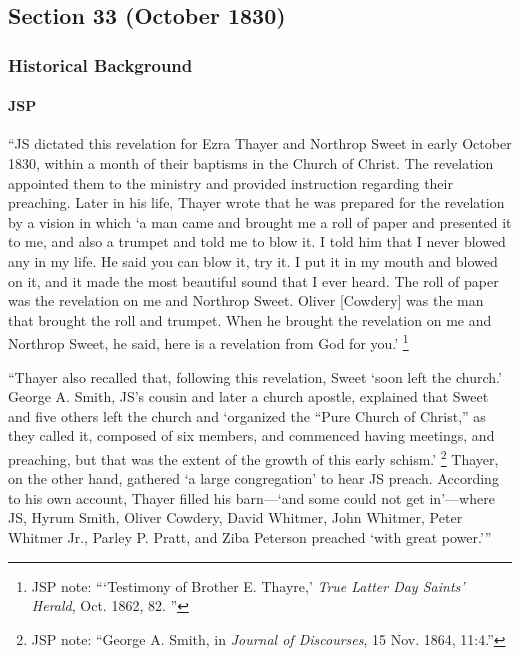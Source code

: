 \subsection{Section 33 (October 1830)}
	\label{DC33}

	\subsubsection{Historical Background}
		\label{DC33-HB}
		
		\paragraph{JSP}
		
			``JS dictated this revelation for Ezra Thayer and Northrop Sweet in early October 1830, within a month of their baptisms in the Church of Christ. The revelation appointed them to the ministry and provided instruction regarding their preaching. Later in his life, Thayer wrote that he was prepared for the revelation by a vision in which `a man came and brought me a roll of paper and presented it to me, and also a trumpet and told me to blow it. I told him that I never blowed any in my life. He said you can blow it, try it. I put it in my mouth and blowed on it, and it made the most beautiful sound that I ever heard. The roll of paper was the revelation on me and Northrop Sweet. Oliver [Cowdery] was the man that brought the roll and trumpet. When he brought the revelation on me and Northrop Sweet, he said, here is a revelation from God for you.'%
				\footnote{%
					JSP note: ```Testimony of Brother E. Thayre,' \textit{True Latter Day Saints' Herald}, Oct. 1862, 82. ''
					}
			
			``Thayer also recalled that, following this revelation, Sweet `soon left the church.' George A. Smith, JS's cousin and later a church apostle, explained that Sweet and five others left the church and `organized the ``Pure Church of Christ,'' as they called it, composed of six members, and commenced having meetings, and preaching, but that was the extent of the growth of this early schism.'%
				\footnote{%
					JSP note: ``George A. Smith, in \textit{Journal of Discourses}, 15 Nov. 1864, 11:4.''
					}
			Thayer, on the other hand, gathered `a large congregation' to hear JS preach. According to his own account, Thayer filled his barn---`and some could not get in'---where JS, Hyrum Smith, Oliver Cowdery, David Whitmer, John Whitmer, Peter Whitmer Jr., Parley P. Pratt, and Ziba Peterson preached `with great power.'''
			
